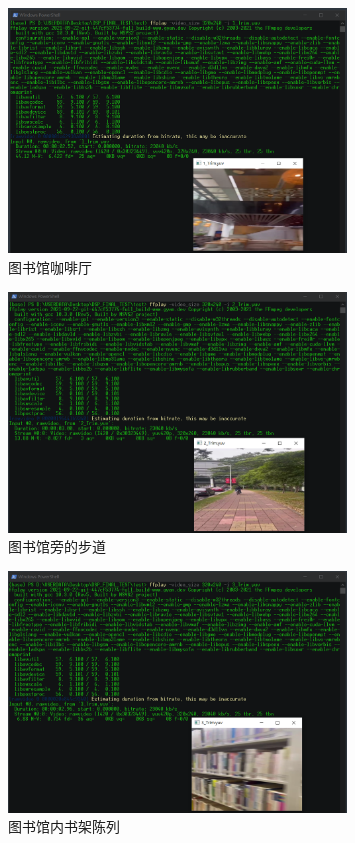 \documentclass[10pt,UTF8]{ctexart}
\begin{document}
\begin{figure}[H]
\centering 
\includegraphics[width=0.80\textwidth]{1.png} 
\caption{图书馆咖啡厅}
\label{Test}
\end{figure}

\begin{figure}[H]
\centering 
\includegraphics[width=0.80\textwidth]{2.png} 
\caption{图书馆旁的步道}
\label{Test}
\end{figure}

\begin{figure}[H]
\centering 
\includegraphics[width=0.80\textwidth]{3.png} 
\caption{图书馆内书架陈列}
\label{Test}
\end{figure}
\end{document}
